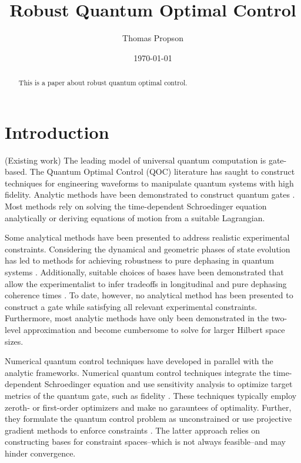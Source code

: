 \documentclass[
  amsfonts,
  amsmath,
  tbtags,
  amssymb,
  aps,
  nobibnotes,
  twocolumn,
]{revtex4-2}
\begin{document}
\title{Robust Quantum Optimal Control}

\author{Thomas Propson}

\date{\today}


\begin{abstract}
  This is a paper about robust quantum optimal control.
\end{abstract}

\maketitle


\section{Introduction}
(Existing work) The leading model of universal
quantum computation is gate-based. The Quantum Optimal Control (QOC)
literature has saught to construct techniques for engineering waveforms to manipulate
quantum systems with high fidelity.
Analytic methods
have been demonstrated to construct quantum gates
\cite{zhang2020universal, huang2020engineering, han2020experimental,
  xu2020nonadiabatic, carlini2005quantum}.
Most methods rely on solving the time-dependent
Schroedinger equation analytically or deriving equations of motion
from a suitable Lagrangian.

Some analytical methods
have been presented to address realistic experimental constraints.
Considering the dynamical and geometric phases of state
evolution has led to methods for achieving
robustness to pure dephasing in quantum systems
\cite{xu2020nonadiabatic, han2020experimental, merrill2014progress}.
Additionally, suitable choices of bases have been demonstrated that
allow the experimentalist to infer tradeoffs in longitudinal
and pure dephasing coherence times \cite{huang2020engineering}.
To date, however, no analytical method has been presented
to construct a gate while satisfying all relevant experimental
constraints. Furthermore, most analytic methods have only
been demonstrated in the two-level approximation and become
cumbersome to solve for larger Hilbert space sizes.

Numerical quantum control techniques have developed in parallel
with the analytic frameworks. Numerical quantum control
techniques integrate the time-dependent Schroedinger
equation and use sensitivity analysis to optimize target metrics
of the quantum gate, such as fidelity
\cite{leung2017speedup,  goerz2019krotov, doria2011optimal,
  abdelhafez2019gradient, machnes2015gradient, leng2019robust}.
These techniques typically employ zeroth- or first-order
optimizers and make no garauntees of optimality.
Further, they formulate the quantum control
problem as unconstrained or use
projective gradient methods to enforce constraints
\cite{machnes2015gradient}.
The latter approach relies on constructing
bases for constraint spaces--which is not always feasible--and
may hinder convergence.
\end{document}
